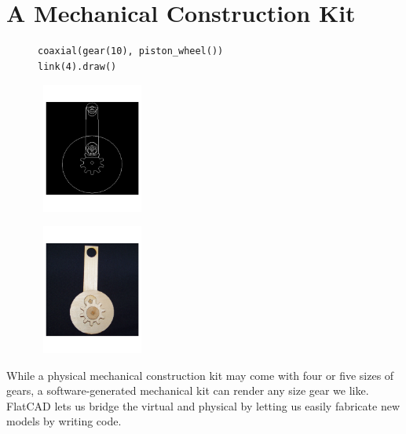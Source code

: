 \documentclass[times, 10pt,twocolumn]{article}
\makeatletter
\newenvironment{subfloat}%
{\def\caption##1{\gdef\subcapsave{\relax##1}}%
\let\subcapsave=\@empty %
\let\sf@oldlabel=\label 
\def\label##1{\xdef\sublabsave{\noexpand\label{##1}}}%
\let\sublabsave\relax %
\setbox\subfigbox\hbox 
\bgroup}%
{\egroup %
\let\label=\sf@oldlabel 
\subfigure[\subcapsave]{\box\subfigbox}}%
\makeatother
\begin{document}
\section{A Mechanical Construction Kit}


\begin{figure}
\centering
  \begin{subfloat}
    \begin{minipage}{2.6in} 
      \small
\begin{verbatim}
coaxial(gear(10), piston_wheel())
link(4).draw()
\end{verbatim}
    \end{minipage}%
  \end{subfloat} 
  \begin{minipage}{1.3in}
      \centering 
    \begin{subfloat}
      \includegraphics[width=1.3in]{mechanism_graphics.pdf}
    \end{subfloat}
  \end{minipage}
  \begin{minipage}{1.3in}
      \centering 
    \begin{subfloat}
      \includegraphics[width=1.3in]{mechanism_physical.pdf}
    \end{subfloat}
  \end{minipage}
  \caption{High-level \nohyphens{FlatLang} code, graphics, and
    physical output for a simple mechanism.}
  \label{fig:machine-code} 
\end{figure} 

While a physical mechanical construction kit may come with four or
five sizes of gears, a software-generated mechanical kit can render
any size gear we like. \nohyphens{FlatCAD} lets us bridge the virtual
and physical by letting us easily fabricate new models by writing
code.
\end{document}
